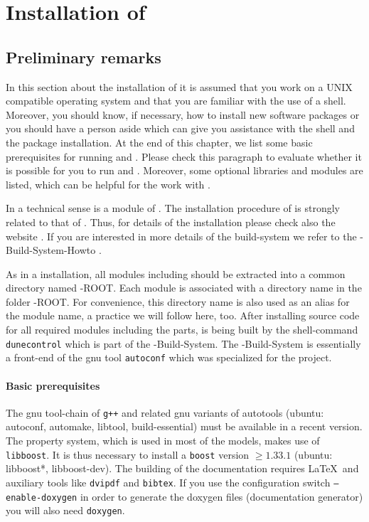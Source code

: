 \section{Installation of \Dumux} \label{install}
\subsection{Preliminary remarks}

In this section about the installation of \Dumux it is assumed that you work on a UNIX compatible operating system and that you are familiar with the use of a shell. 
Moreover, you should know,  if necessary, how to install new software packages or you should have a person aside which can give you assistance with the shell and the package installation. 
At the end of this chapter, we list some basic prerequisites for running \Dune and \Dumux. 
Please check this paragraph to evaluate whether it is possible for you to run \Dune and \Dumux. 
Moreover, some optional libraries and modules are listed, which can be helpful for the work with \Dumux. 

In a technical sense \Dumux is a module of \Dune. 
The installation procedure of \Dumux is strongly related to that of \Dune. 
Thus, for details of the installation please check also the {\Dune} website \cite{DUNE-HP}. 
If you are interested in more details of the build-system we refer to the {\Dune}-Build-System-Howto \cite{DUNE-HP}.

As in a \Dune installation, all \Dune modules including \Dumux should be extracted into a common directory named {\Dune}-ROOT.
Each \Dune module is associated with a directory name in the folder {\Dune}-ROOT. For convenience, this directory name is  also used as an alias for the module name, a practice we will follow here, too. After installing source code for all required \Dune modules including the \Dumux parts, \Dune is being built by the shell-command \texttt{dunecontrol} which is part of the {\Dune}-Build-System. The {\Dune}-Build-System is essentially a front-end of the gnu tool \texttt{autoconf} which was specialized for the \Dune project.

\paragraph{Basic prerequisites} \label{prerequisites}
The gnu tool-chain of \texttt{g++}  and related gnu variants of autotools (ubuntu: autoconf, automake, libtool, build-essential) must be available in a recent version. 
The \Dumux property system, which is used in most of the models, makes use of \texttt{libboost}. 
It is thus necessary to install a  \texttt{boost}  version $\geqslant 1.33.1$ (ubuntu: libboost*, libboost-dev). 
The building of the documentation requires \LaTeX\ and auxiliary tools like \texttt{dvipdf} and \texttt{bibtex}. 
If you use the configuration switch \texttt{--enable-doxygen} in order to generate the doxygen files (documentation generator) you will also need \texttt{doxygen}.

